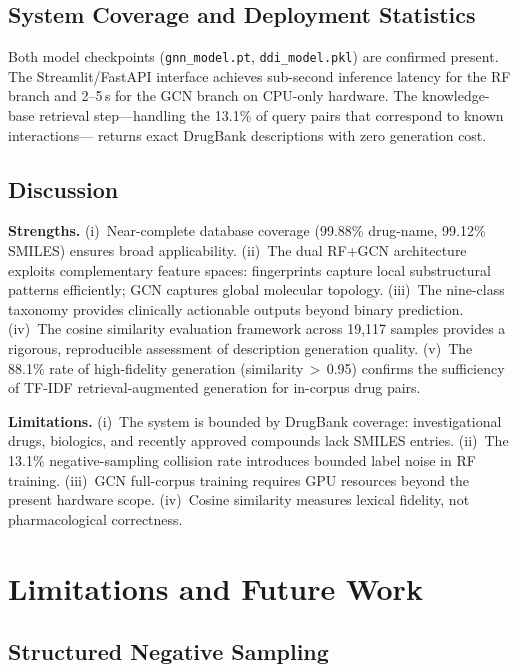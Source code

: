 \documentclass[conference]{IEEEtran}
\begin{document}
\subsection{System Coverage and Deployment Statistics}

Both model checkpoints (\texttt{gnn\_model.pt}, \texttt{ddi\_model.pkl}) are confirmed
present. The Streamlit/FastAPI interface achieves sub-second inference latency for the
RF branch and 2--5\,s for the GCN branch on CPU-only hardware. The knowledge-base
retrieval step---handling the 13.1\% of query pairs that correspond to known interactions---
returns exact DrugBank descriptions with zero generation cost.

\subsection{Discussion}

\textbf{Strengths.}
(i)~Near-complete database coverage (99.88\% drug-name, 99.12\% SMILES) ensures broad
applicability.
(ii)~The dual RF+GCN architecture exploits complementary feature spaces: fingerprints
capture local substructural patterns efficiently; GCN captures global molecular topology.
(iii)~The nine-class taxonomy provides clinically actionable outputs beyond binary prediction.
(iv)~The cosine similarity evaluation framework across 19,117 samples provides a rigorous,
reproducible assessment of description generation quality.
(v)~The 88.1\% rate of high-fidelity generation (similarity\,$>$\,0.95) confirms the
sufficiency of TF-IDF retrieval-augmented generation for in-corpus drug pairs.

\textbf{Limitations.}
(i)~The system is bounded by DrugBank coverage: investigational drugs, biologics, and
recently approved compounds lack SMILES entries.
(ii)~The 13.1\% negative-sampling collision rate introduces bounded label noise in RF
training.
(iii)~GCN full-corpus training requires GPU resources beyond the present hardware scope.
(iv)~Cosine similarity measures lexical fidelity, not pharmacological correctness.

\section{Limitations and Future Work}
\label{sec:limitations}

\subsection{Structured Negative Sampling}
\end{document}
